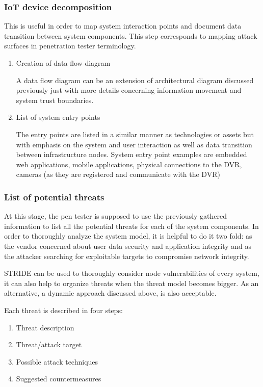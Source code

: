 \subsubsection{IoT device decomposition}

This is useful in order to map system interaction points and document data transition between system components. This step corresponds to mapping attack surfaces in penetration tester terminology\cite{surface-mapping}.

\begin{enumerate}
	\item Creation of data flow diagram
	
	A data flow diagram can be an extension of architectural diagram discussed previously just with more details concerning information movement and system trust boundaries.
	
	\item List of system entry points
	
	The entry points are listed in a similar manner as technologies or assets but with emphasis on the system and user interaction as well as data transition between infrastructure nodes.
	\newline
	System entry point examples are embedded web applications, mobile applications, physical connections to the DVR, cameras (as they are registered and communicate with the DVR)
\end{enumerate}

\subsubsection{List of potential threats}

At this stage, the pen tester is supposed to use the previously gathered information to list all the potential threats for each of the system components. In order to thoroughly analyze the system model, it is helpful to do it two fold: as the vendor concerned about user data security and application integrity and as the attacker searching for exploitable targets to compromise network integrity.

STRIDE can be used to thoroughly consider node vulnerabilities of every system, it can also help to organize threats when the threat model becomes bigger. As an alternative, a dynamic approach discussed above, is also acceptable.

Each threat is described in four steps:
\begin{enumerate}
	\item Threat description
	\item Threat/attack target
	\item Possible attack techniques
	\item Suggested countermeasures
\end{enumerate}


